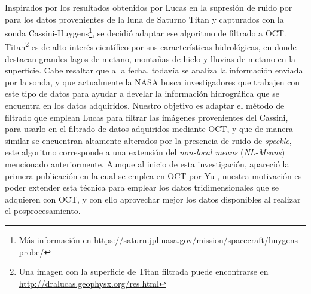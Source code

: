 Inspirados por los resultados obtenidos por Lucas \etal \cite{Lucas2014} en la supresión de ruido por \speckle para los datos provenientes de la luna de Saturno Titan y capturados con la sonda Cassini-Huygens\footnote{Más información en \url{https://saturn.jpl.nasa.gov/mission/spacecraft/huygens-probe/}}, se decidió adaptar ese algoritmo de filtrado a OCT. Titan\footnote{Una imagen con la superficie de Titan filtrada puede encontrarse en \url{http://dralucas.geophysx.org/res.html}} es de alto interés científico por sus características hidrológicas, en donde destacan grandes lagos de metano, montañas de hielo y lluvias de metano en la superficie. Cabe resaltar que a la fecha, todavía se analiza la información enviada por la sonda, y que actualmente la NASA busca investigadores que trabajen con este tipo de datos para ayudar a develar la información hidrográfica que se encuentra en los datos adquiridos. Nuestro objetivo es adaptar el método de filtrado que emplean Lucas \etal para filtrar las imágenes provenientes del Cassini, para usarlo en el filtrado de datos adquiridos mediante OCT, y que de manera similar se encuentran altamente alterados por la presencia de ruido de \textit{speckle}, este algoritmo corresponde a una extensión del \textit{non-local means} (\textit{NL-Means}) mencionado anteriormente. Aunque al inicio de esta investigación, apareció la primera publicación en la cual se emplea \nlmeans en OCT por Yu \etal \cite{Yu2016}, nuestra motivación es poder extender esta técnica para emplear los datos tridimensionales que se adquieren con OCT, y con ello aprovechar mejor los datos disponibles al realizar el posprocesamiento.


